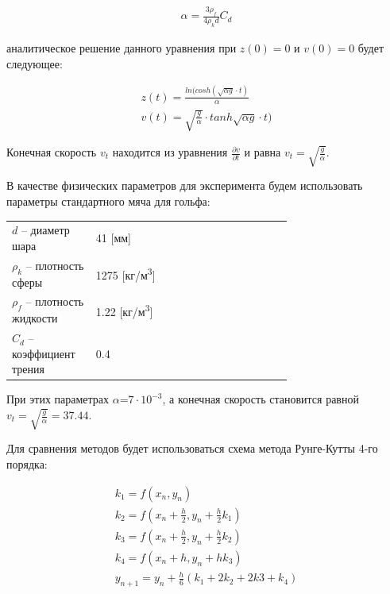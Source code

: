 \documentclass[master, och, diploma, times]{sty/SCWorks}
\theoremstyle{plain}
\theoremstyle{definition}
\begin{document}
\begin{equation}
\begin{aligned}
\alpha = \frac{3\rho_f}{4\rho_k d}C_d
\end{aligned}
\end{equation}

\noindent аналитическое решение данного уравнения при $z(0)=0$ и $v(0)=0$ будет следующее:

\begin{equation}
\begin{aligned}
z(t)=\frac{ln(cosh(\sqrt{\alpha g} \cdot t)}{\alpha} \\
v(t)=\sqrt{\frac{g}{\alpha}} \cdot tanh{\sqrt{\alpha g} \cdot t)}
\end{aligned}
\end{equation}

Конечная скорость $v_t$ находится из уравнения $\frac{\partial v}{ \partial t}$ и равна $v_t=\sqrt{\frac{g}{\alpha}}$.

В качестве физических параметров для эксперимента будем использовать параметры стандартного мяча для гольфа:

\begin{threeparttable}
\begin{longtable}[H]{lp{0.7\linewidth}}
{$d$} -- диаметр шара & 41 [мм] \\
{$\rho_k$} -- плотность сферы & 1275 [кг/м\textsuperscript{3}] \\
{$\rho_f$} -- плотность жидкости & 1.22 [кг/м\textsuperscript{3}] \\
{$C_d$} -- коэффициент трения & 0.4 
\end{longtable} 
\end{threeparttable}


При этих параметрах $\alpha$=$7 \cdot 10^{-3}$, а конечная скорость становится равной $v_t=\sqrt{\frac{g}{\alpha}}=37.44$.


Для сравнения методов будет использоваться схема метода Рунге-Кутты 4-го порядка:

\begin{equation}%
\begin{aligned}
k_1 = f(x_n, y_n) \\
k_2 = f(x_n+\frac{h}{2}, y_n+\frac{h}{2}k_1) \\
k_3 = f(x_n+\frac{h}{2}, y_n+\frac{h}{2}k_2) \\ 
k_4 = f(x_n+h, y_n+hk_3) \\
y_{n+1}=y_n+\frac{h}{6}(k_1+2k_2+2k3+k_4)
\end{aligned}
\end{equation}
\end{document}
